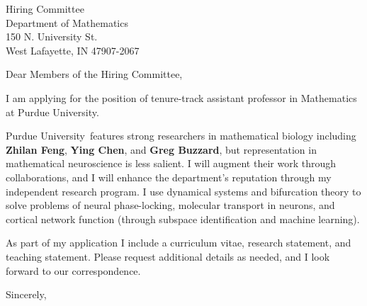 \documentclass[11pt,a4paper]{letter}
\begin{document}
\def\School{Purdue University}
\begin{letter}
{Hiring Committee\\
Department of Mathematics\\
150 N. University St.\\
West Lafayette, IN 47907-2067}


\opening{Dear Members of the Hiring Committee,}

I am applying for the position of tenure-track assistant professor in Mathematics at \School. 



\School~features strong researchers in mathematical biology including \textbf{Zhilan Feng}, \textbf{Ying Chen}, and \textbf{Greg Buzzard}, but representation in mathematical neuroscience is less salient. I will augment their work through collaborations, and I will enhance the department's reputation through my independent research program. I use dynamical systems and bifurcation theory to solve problems of neural phase-locking, molecular transport in neurons, and cortical network function (through subspace identification and machine learning).



As part of my application I include a curriculum vitae, research statement, and teaching statement. Please request additional details as needed, and I look forward to our correspondence.

\closing{Sincerely,}
\end{letter}
\end{document}
